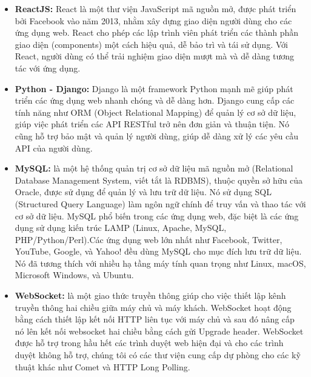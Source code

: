 \begin{itemize}
    \item \textbf{ReactJS:} React là một thư viện JavaScript mã nguồn mở, được phát triển bởi Facebook vào năm 2013, nhằm xây dựng giao diện người dùng cho các ứng dụng web. React cho phép các lập trình viên phát triển các thành phần giao diện (components) một cách hiệu quả, dễ bảo trì và tái sử dụng. Với React, người dùng có thể trải nghiệm giao diện mượt mà và dễ dàng tương tác với ứng dụng.
\end{itemize}

\begin{itemize}
    \item \textbf{Python - Django:} Django là một framework Python mạnh mẽ giúp phát triển các ứng dụng web nhanh chóng và dễ dàng hơn. Django cung cấp các tính năng như ORM (Object Relational Mapping) để quản lý cơ sở dữ liệu, giúp việc phát triển các API RESTful trở nên đơn giản và thuận tiện. Nó cũng hỗ trợ bảo mật và quản lý người dùng, giúp dễ dàng xử lý các yêu cầu API của người dùng.
\end{itemize}

\begin{itemize}
    \item \textbf{MySQL:} là một hệ thống quản trị cơ sở dữ liệu mã nguồn mở (Relational Database Management System, viết tắt là RDBMS), thuộc quyền sở hữu của Oracle, được sử dụng để quản lý và lưu trữ dữ liệu. Nó sử dụng SQL (Structured Query Language) làm ngôn ngữ chính để truy vấn và thao tác với cơ sở dữ liệu. MySQL phổ biến trong các ứng dụng web, đặc biệt là các ứng dụng sử dụng kiến trúc LAMP (Linux, Apache, MySQL, PHP/Python/Perl).Các ứng dụng web lớn nhất như Facebook, Twitter, YouTube, Google, và Yahoo! đều dùng MySQL cho mục đích lưu trữ dữ liệu. Nó đã tương thích với nhiều hạ tầng máy tính quan trọng như Linux, macOS, Microsoft Windows, và Ubuntu.
\end{itemize}

\begin{itemize}
    \item \textbf{WebSocket:} là một giao thức truyền thông giúp cho việc thiết lập kênh truyền thông hai chiều giữa máy chủ và máy khách. WebSocket hoạt động bằng cách thiết lập kết nối HTTP liên tục với máy chủ và sau đó nâng cấp nó lên kết nối websocket hai chiều bằng cách gửi Upgrade header. WebSocket được hỗ trợ trong hầu hết các trình duyệt web hiện đại và cho các trình duyệt không hỗ trợ, chúng tôi có các thư viện cung cấp dự phòng cho các kỹ thuật khác như Comet và HTTP Long Polling.
\end{itemize}





